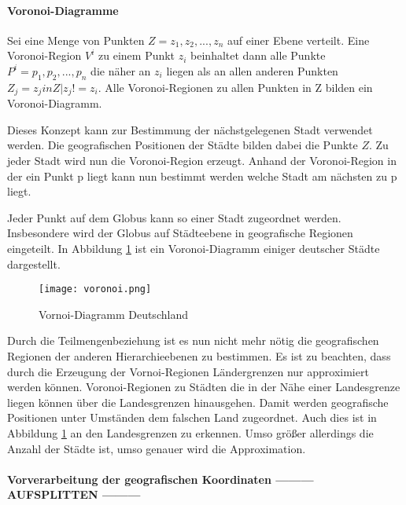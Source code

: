				\paragraph{Voronoi-Diagramme} 

					Sei eine Menge von Punkten $Z = {z_1,z_2,...,z_n}$ auf einer Ebene verteilt.
					Eine Voronoi-Region $V^i$ zu einem Punkt $z_i$ beinhaltet dann alle Punkte $P^i={p_1,p_2,...,p_n}$ die näher an $z_i$ liegen als an allen anderen Punkten $Z_j={z_j in Z|z_j!=z_i}$.
					Alle Voronoi-Regionen zu allen Punkten in Z bilden ein Voronoi-Diagramm.

					Dieses Konzept kann zur Bestimmung der nächstgelegenen Stadt verwendet werden. 
					Die geografischen Positionen der Städte bilden dabei die Punkte $Z$.
					Zu jeder Stadt wird nun die Voronoi-Region erzeugt. 
					Anhand der Voronoi-Region in der ein Punkt p liegt kann nun bestimmt werden welche Stadt am nächsten zu p liegt.

					Jeder Punkt auf dem Globus kann so einer Stadt zugeordnet werden.
					Insbesondere wird der Globus auf Städteebene in geografische Regionen eingeteilt.
					In Abbildung \ref{img:voronoi} ist ein Voronoi-Diagramm einiger deutscher Städte dargestellt.

					\begin{figure}[h!]
					\begin{center}
					\texttt{[image: voronoi.png]}
					\caption{Vornoi-Diagramm Deutschland}
					\label{img:voronoi}
					\end{center}
					\end{figure}	

					Durch die Teilmengenbeziehung ist es nun nicht mehr nötig die geografischen Regionen der anderen Hierarchieebenen zu bestimmen.
					Es ist zu beachten, dass durch die Erzeugung der Vornoi-Regionen Ländergrenzen nur approximiert werden können. 
					Voronoi-Regionen zu Städten die in der Nähe einer Landesgrenze liegen können über die Landesgrenzen hinausgehen. 
					Damit werden geografische Positionen unter Umständen dem falschen Land zugeordnet.
					Auch dies ist in Abbildung \ref{img:voronoi} an den Landesgrenzen zu erkennen. 
					Umso größer allerdings die Anzahl der Städte ist, umso genauer wird die Approximation. 

				\paragraph{Vorverarbeitung der geografischen Koordinaten --------- AUFSPLITTEN ---------}

